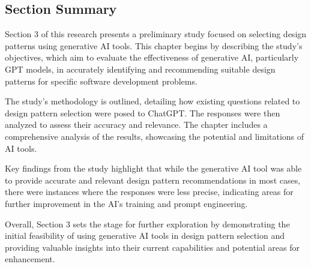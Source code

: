 \subsection{Section Summary}

Section 3 of this research presents a preliminary study focused on selecting design patterns using generative AI tools. This chapter begins by describing the study's objectives, which aim to evaluate the effectiveness of generative AI, particularly GPT models, in accurately identifying and recommending suitable design patterns for specific software development problems.

The study's methodology is outlined, detailing how existing questions related to design pattern selection were posed to ChatGPT. The responses were then analyzed to assess their accuracy and relevance. The chapter includes a comprehensive analysis of the results, showcasing the potential and limitations of AI tools.

Key findings from the study highlight that while the generative AI tool was able to provide accurate and relevant design pattern recommendations in most cases, there were instances where the responses were less precise, indicating areas for further improvement in the AI's training and prompt engineering.

Overall, Section 3 sets the stage for further exploration by demonstrating the initial feasibility of using generative AI tools in design pattern selection and providing valuable insights into their current capabilities and potential areas for enhancement.